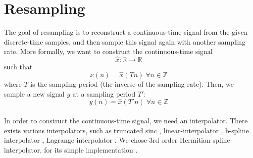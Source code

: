 \documentclass[letterpaper]{article}
\begin{document}
\section{Resampling}
The goal of resampling is to reconstruct a continuous-time signal from the given
discrete-time samples, and then sample this signal again with another sampling
rate. More formally, we want to construct the continuous-time signal
\begin{equation}\hat x:\mathbb{R}\to\mathbb{R}\end{equation}
such that
\begin{equation}x(n) = \hat x(Tn) \;\forall n\in\mathbb{Z}\end{equation}
where \(T\) is the sampling period (the inverse of the sampling rate). Then, we
sample a new signal \(y\) at a sampling period \(T'\):
\begin{equation*}y(n) = \hat x(T'n) \;\forall n\in\mathbb{Z}\end{equation*}

\paragraph{}
In order to construct the continuous-time signal, we need an interpolator. There
exists various interpolators, such as truncated sinc
\citep{duncan1988fundamentals, rossum1989an}, linear-interpolator
\citep{rossum1993}, b-spline interpolator \citep{Sankar1998},
Lagrange interpolator \citep{Schafer1973}. We chose 3rd order Hermitian spline
interpolator, for its simple implementation \citep{Grisoni97anhermitian}.
\end{document}
